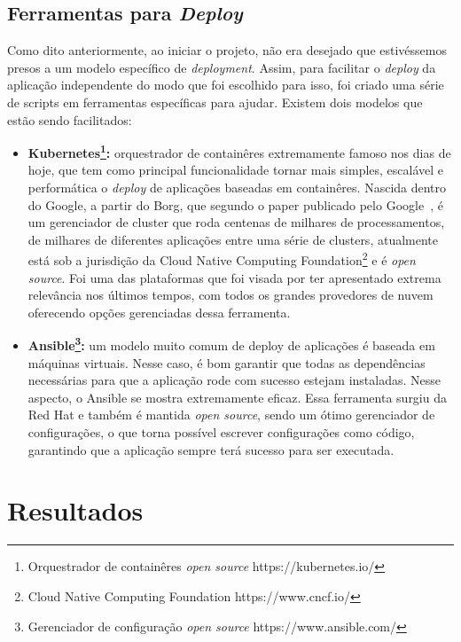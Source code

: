 \documentclass[11pt,twoside]{article}
\begin{document}
\subsection{Ferramentas para \emph{Deploy}}

Como dito anteriormente, ao iniciar o projeto, não era desejado que estivéssemos presos a um modelo específico de \emph{deployment}. Assim, para facilitar o \emph{deploy} da aplicação independente
do modo que foi escolhido para isso, foi criado uma série de scripts em ferramentas específicas para ajudar. Existem dois modelos que estão sendo facilitados:

\begin{itemize}
  \item \textbf{Kubernetes\footnote{Orquestrador de containêres \emph{open source} https://kubernetes.io/}:} orquestrador de containêres extremamente famoso nos dias de hoje, que tem como principal funcionalidade tornar mais simples, escalável e performática o \emph{deploy}
  de aplicações baseadas em containêres. Nascida dentro do Google, a partir do Borg, que segundo o paper publicado pelo Google~\cite{BORG}, é um gerenciador de cluster que roda centenas de milhares de processamentos,
  de milhares de diferentes aplicações entre uma série de clusters,
  atualmente está sob a jurisdição da Cloud Native Computing Foundation\footnote{Cloud Native Computing Foundation https://www.cncf.io/} e é \emph{open source}. Foi uma
  das plataformas que foi visada por ter apresentado extrema relevância nos últimos tempos, com todos os grandes provedores de nuvem oferecendo opções gerenciadas dessa 
  ferramenta.
  \item \textbf{Ansible\footnote{Gerenciador de configuração \emph{open source} https://www.ansible.com/}:} um modelo muito comum de deploy de aplicações é baseada em máquinas virtuais. Nesse caso, é bom garantir que todas as dependências necessárias para que a 
  aplicação rode com sucesso estejam instaladas. Nesse aspecto, o Ansible se mostra extremamente eficaz. Essa ferramenta surgiu da Red Hat e também é mantida \emph{open source}, sendo um
  ótimo gerenciador de configurações, o que torna possível escrever configurações como código, garantindo que a aplicação sempre terá sucesso para ser executada.
\end{itemize}

\section{Resultados}
\end{document}
